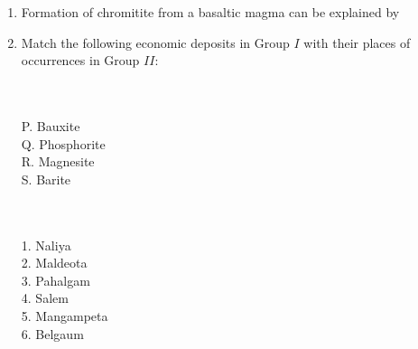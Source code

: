 \documentclass[12pt,fleqn]{article}
\theoremstyle{remark}
\begin{document}
\begin{enumerate}[label=Q.\arabic*.]
    \item Formation of chromitite from a basaltic magma can be explained by \hfill{} 
        \begin {enumerate}
            \end{enumerate}
    \item Match the following economic deposits in Group $I$ with their places of occurrences in Group $II$: \hfill{} \\
    
\begin{multicols}{2}
            \\\\
            P. Bauxite\\
            Q. Phosphorite\\
            R. Magnesite\\
            S. Barite

            \columnbreak
            
            \\\\
            1. Naliya\\
            2. Maldeota\\
            3. Pahalgam\\
            4. Salem\\
            5. Mangampeta\\
            6. Belgaum


\end{multicols}
\end{enumerate}
\end{document}
